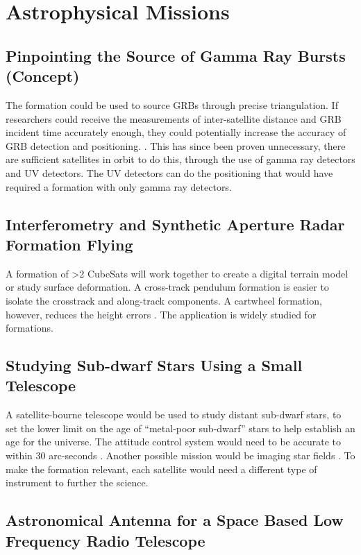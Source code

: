 \section{Astrophysical Missions}

\subsection{Pinpointing the Source of Gamma Ray Bursts (Concept)}

The formation could be used to source GRBs through precise triangulation. If researchers could receive the measurements of inter-satellite distance and GRB incident time accurately enough, they could potentially increase the accuracy of GRB detection and positioning. \cite{Ref:Dill}. This has since been proven unnecessary, there are sufficient satellites in orbit to do this, through the use of gamma ray detectors and UV detectors. The UV detectors can do the positioning that would have required a formation with only gamma ray detectors. 

\subsection{Interferometry and Synthetic Aperture Radar Formation Flying}

A formation of >2 CubeSats will work together to create a digital
terrain model or study surface deformation. A cross-track pendulum
formation is easier to isolate the crosstrack and along-track components. A cartwheel formation, however, reduces the height errors \cite{Ref:Peterson}. The application is widely studied for formations. 

\subsection{Studying Sub-dwarf Stars Using a Small Telescope}

A satellite-bourne telescope would be used to study distant sub-dwarf stars, to set the lower limit on the age of ``metal-poor sub-dwarf'' stars to help establish an age for the universe. The attitude control system would need to be accurate to within 30 arc-seconds \cite{Ref:Carroll2}. Another possible mission would be imaging star fields \cite{Ref:Nicholas}. To make the formation relevant, each satellite would need a different type of instrument to further the science. 

\subsection{Astronomical Antenna for a Space Based Low Frequency Radio Telescope}

